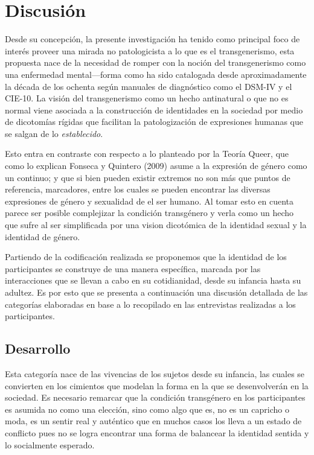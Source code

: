 \section{Discusión}\label{sec:discusion}

Desde su concepción, la presente investigación ha tenido como principal foco de
interés proveer una mirada no patologicista a lo que es el transgenerismo, esta
propuesta nace de la necesidad de romper con la noción del transgenerismo como
una enfermedad mental—forma como ha sido catalogada desde aproximadamente la
década de los ochenta según manuales de diagnóstico como el DSM-IV y el CIE-10.
La visión del transgenerismo como un hecho antinatural o que no es normal viene
asociada a la construcción de identidades en la sociedad por medio de dicotomías
rígidas que facilitan la patologización de expresiones humanas que se salgan de
lo \emph{establecido}.

Esto entra en contraste con respecto a lo planteado por la Teoría Queer, que
como lo explican Fonseca y Quintero (2009) asume a la expresión de género como
un continuo; y que  si bien pueden existir extremos no son más que puntos de
referencia, marcadores, entre los cuales se pueden encontrar las diversas
expresiones de género y sexualidad de el ser humano. Al tomar esto en cuenta
parece ser posible complejizar la condición transgénero y verla como un hecho
que sufre al ser simplificada por una vision dicotómica de la identidad sexual y
la identidad de género.

Partiendo de la codificación realizada se proponemos que la identidad de los
participantes se construye de una manera específica, marcada por las
interacciones que se llevan a cabo en su cotidianidad, desde su infancia hasta
su adultez. Es por esto que se presenta a continuación una discusión detallada
de las categorías elaboradas en base a lo recopilado en las entrevistas
realizadas a los participantes.

\subsection{Desarrollo}

Esta categoría nace de las vivencias de los sujetos desde su infancia, las
cuales se convierten en los cimientos que modelan la forma en la que se
desenvolverán en la sociedad. Es necesario remarcar que la condición transgénero
en los participantes es asumida no como una elección, sino como algo que es, no
es un capricho o moda, es un sentir real y auténtico que en muchos casos los
lleva a un estado de conflicto pues no se logra encontrar una forma de balancear
la identidad sentida y lo socialmente esperado.

